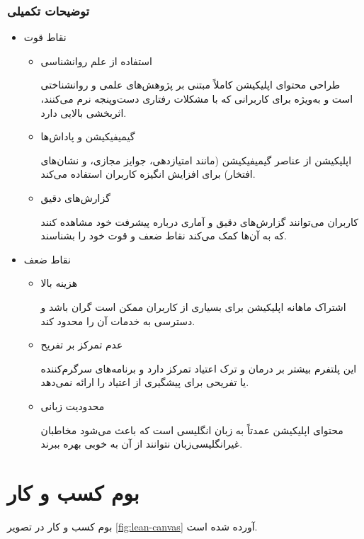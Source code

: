 \documentclass[dvipsnames, svgnames, x11names, 11pt]{article}
\begin{document}
\subsubsection{توضیحات تکمیلی}
\begin{itemize}
\item 
نقاط قوت
\begin{itemize}
\item 
استفاده از علم روانشناسی

طراحی محتوای اپلیکیشن کاملاً مبتنی بر پژوهش‌های علمی و روانشناختی است و به‌ویژه برای کاربرانی که با مشکلات رفتاری دست‌وپنجه نرم می‌کنند، اثربخشی بالایی دارد.

\item 
گیمیفیکیشن و پاداش‌ها

اپلیکیشن از عناصر گیمیفیکیشن (مانند امتیازدهی، جوایز مجازی، و نشان‌های افتخار) برای افزایش انگیزه کاربران استفاده می‌کند.

\item 
گزارش‌های دقیق

کاربران می‌توانند گزارش‌های دقیق و آماری درباره پیشرفت خود مشاهده کنند که به آن‌ها کمک می‌کند نقاط ضعف و قوت خود را بشناسند.
\end{itemize}

\item 
نقاط ضعف

\begin{itemize}
\item 
هزینه بالا

اشتراک ماهانه اپلیکیشن برای بسیاری از کاربران ممکن است گران باشد و دسترسی به خدمات آن را محدود کند.

\item 
عدم تمرکز بر تفریح

این پلتفرم بیشتر بر درمان و ترک اعتیاد تمرکز دارد و برنامه‌های سرگرم‌کننده یا تفریحی برای پیشگیری از اعتیاد را ارائه نمی‌دهد.

\item 
محدودیت زبانی

محتوای اپلیکیشن عمدتاً به زبان انگلیسی است که باعث می‌شود مخاطبان غیرانگلیسی‌زبان نتوانند از آن به خوبی بهره ببرند.
\end{itemize}
\end{itemize}

\section{بوم کسب و کار}

بوم کسب و کار در تصویر 
\ref{fig:lean-canvas}
آورده شده است.
\end{document}
